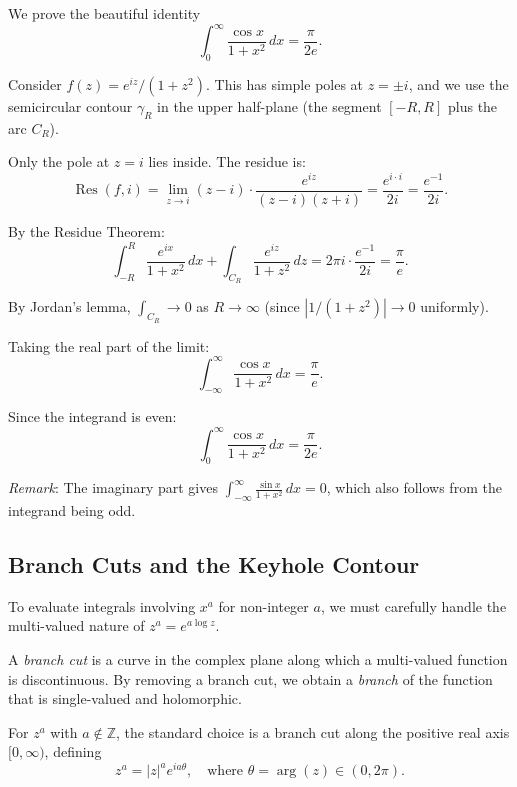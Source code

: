 \begin{example}
  We prove the beautiful identity
  \[
    \int_0^{\infty} \frac{\cos x}{1 + x^2} \, dx = \frac{\pi}{2e}.
  \]

  Consider $f(z) = e^{iz}/(1 + z^2)$. This has simple poles at $z = \pm i$, and we use the semicircular contour $\gamma_R$ in the upper half-plane (the segment $[-R, R]$ plus the arc $C_R$).

  Only the pole at $z = i$ lies inside. The residue is:
  \[
    \operatorname{Res}(f, i) = \lim_{z \to i} (z - i) \cdot \frac{e^{iz}}{(z-i)(z+i)} = \frac{e^{i \cdot i}}{2i} = \frac{e^{-1}}{2i}.
  \]

  By the Residue Theorem:
  \[
    \int_{-R}^{R} \frac{e^{ix}}{1 + x^2} \, dx + \int_{C_R} \frac{e^{iz}}{1 + z^2} \, dz = 2\pi i \cdot \frac{e^{-1}}{2i} = \frac{\pi}{e}.
  \]

  By Jordan's lemma, $\int_{C_R} \to 0$ as $R \to \infty$ (since $|1/(1+z^2)| \to 0$ uniformly).

  Taking the real part of the limit:
  \[
    \int_{-\infty}^{\infty} \frac{\cos x}{1 + x^2} \, dx = \frac{\pi}{e}.
  \]

  Since the integrand is even:
  \[
    \boxed{\int_0^{\infty} \frac{\cos x}{1 + x^2} \, dx = \frac{\pi}{2e}.}
  \]

  \textit{Remark}: The imaginary part gives $\int_{-\infty}^{\infty} \frac{\sin x}{1+x^2} \, dx = 0$, which also follows from the integrand being odd.
\end{example}

\subsection{Branch Cuts and the Keyhole Contour}

To evaluate integrals involving $x^a$ for non-integer $a$, we must carefully handle the multi-valued nature of $z^a = e^{a \log z}$.

\begin{definition}
  A \emph{branch cut} is a curve in the complex plane along which a multi-valued function is discontinuous.
  By removing a branch cut, we obtain a \emph{branch} of the function that is single-valued and holomorphic.

  For $z^a$ with $a \notin \mathbb{Z}$, the standard choice is a branch cut along the positive real axis $[0, \infty)$, defining
  \[
    z^a = |z|^a e^{ia\theta}, \quad \text{where } \theta = \arg(z) \in (0, 2\pi).
  \]
\end{definition}

